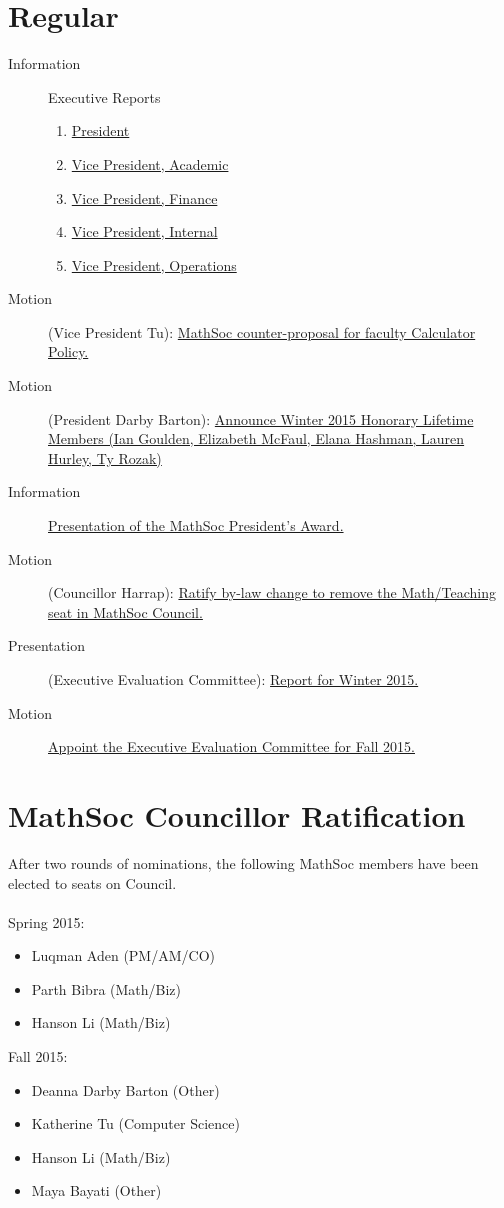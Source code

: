 \documentclass[12pt, letterpaper]{article}
\begin{document}
\section*{Regular}
\begin{description}
	\item[Information] Executive Reports
	\begin{enumerate}
		\item \hyperref[president]{President}
		\item \hyperref[vpacademic]{Vice President, Academic}
		\item \hyperref[vpfinance]{Vice President, Finance}
		\item \hyperref[vpinternal]{Vice President, Internal}
		\item \hyperref[vpoperations]{Vice President, Operations}
	\end{enumerate}
	\item[Motion] (Vice President Tu): \hyperref[calc]{MathSoc counter-proposal for faculty Calculator Policy.}
	\item[Motion] (President Darby Barton): \hyperref[hlm]{Announce Winter 2015 Honorary Lifetime Members (Ian Goulden, Elizabeth McFaul, Elana Hashman, Lauren Hurley, Ty Rozak)}
	\item[Information] \hyperref[award]{Presentation of the MathSoc President's Award.}
	\item[Motion] (Councillor Harrap): \hyperref[teaching]{Ratify by-law change to remove the Math/Teaching seat in MathSoc Council.}
	\item[Presentation] (Executive Evaluation Committee): \hyperref[eec]{Report for Winter 2015.}
	\item[Motion] \hyperref[honour]{Appoint the Executive Evaluation Committee for Fall 2015.}
\end{description}
\HRule

\newpage


\newpage
{}
\section*{MathSoc Councillor Ratification}
After two rounds of nominations, the following MathSoc members have been elected to seats on Council.\\\\
Spring 2015:
\begin{itemize}
	\item Luqman Aden (PM/AM/CO)
	\item Parth Bibra (Math/Biz)
	\item Hanson Li (Math/Biz)
\end{itemize}
Fall 2015:
\begin{itemize}
	\item Deanna Darby Barton (Other)
	\item Katherine Tu (Computer Science)
	\item Hanson Li (Math/Biz)
	\item Maya Bayati (Other)
\end{itemize}
\end{document}
